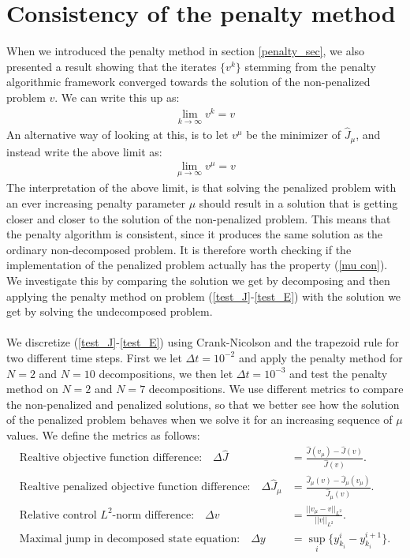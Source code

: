 \section{Consistency of the penalty method} \label{consistency_sec}
When we introduced the penalty method in section \ref{penalty_sec}, we also presented a result showing that the iterates $\{v^k\}$ stemming from the penalty algorithmic framework converged towards the solution of the non-penalized problem $v$. We can write this up as:
\begin{align*}
\lim_{k\rightarrow\infty} v^k = v 
\end{align*}  
An alternative way of looking at this, is to let $v^{\mu}$ be the minimizer of $\hat J_{\mu}$, and instead write the above limit as:
\begin{align}
\lim_{\mu\rightarrow\infty} v^{\mu} = v \label{mu con}
\end{align}
The interpretation of the above limit, is that solving the penalized problem with an ever increasing penalty parameter $\mu$ should result in a solution that is getting closer and closer to the solution of the non-penalized problem. This means that the penalty algorithm is consistent, since it produces the same solution as the ordinary non-decomposed problem. It is therefore worth checking if the implementation of the penalized problem actually has the property (\ref{mu con}). We investigate this by comparing the solution we get by decomposing and then applying the penalty method on problem (\ref{test_J}-\ref{test_E}) with the solution we get by solving the undecomposed problem. 
\\
\\
We discretize (\ref{test_J}-\ref{test_E}) using Crank-Nicolson and the trapezoid rule for two different time steps. First we let $\Delta t = 10^{-2}$ and apply the penalty method for $N=2$ and $N=10$ decompositions, we then let $\Delta t = 10^{-3}$ and test the penalty method on $N=2$ and $N=7$ decompositions. We use different metrics to compare the non-penalized and penalized solutions, so that we better see how the solution of the penalized problem behaves when we solve it for an increasing sequence of $\mu$ values. We define the metrics as follows:
\begin{align}
\textrm{Realtive objective function difference:}\quad \Delta \hat J &= \frac{\hat{J}(v_{\mu})-\hat{J}(v)}{\hat{J}(v)}.\label{mes1}\\
\textrm{Realtive penalized objective function difference:}\quad \Delta \hat J_{\mu} &= \frac{\hat{J}_{\mu}(v)-\hat{J}_{\mu}(v_{\mu})}{\hat{J}_{\mu}(v)}.\\
\textrm{Relative control $L^2$-norm difference:}\quad \Delta v&=\frac{||v_{\mu}-v||_ {L^2}}{||v||_{L^2}}. \\
\textrm{Maximal jump in decomposed state equation:}\quad \Delta y&= \sup_i\{y_{k_i}^i-y_{k_i}^{i+1}\}.\label{mes4}
\end{align}
